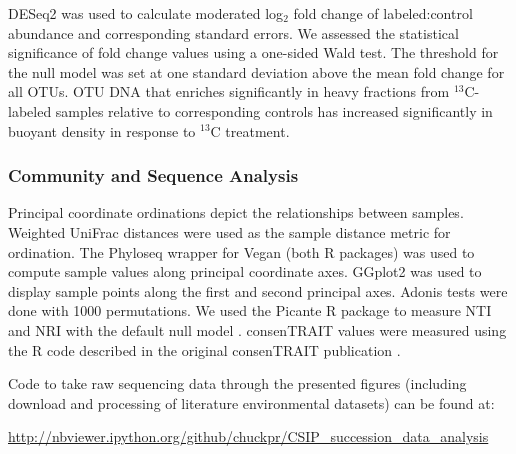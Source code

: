 \documentclass{article}
\begin{document}
DESeq2 was used to calculate moderated log$_{2}$ fold change of
labeled:control abundance and corresponding standard errors. We assessed
the statistical significance of fold change values using a one-sided Wald
test. The threshold for the null model was set at one standard deviation
above the mean fold change for all OTUs. OTU DNA that enriches
significantly in heavy fractions from $^{13}$C-labeled samples relative to
corresponding controls has increased significantly in buoyant density in
response to $^{13}$C treatment.

\subsubsection{Community and Sequence Analysis}\label{ord} Principal coordinate
ordinations depict the relationships between samples. Weighted UniFrac
\citep{Lozupone_2005} distances were used as the sample distance metric for
ordination. The Phyloseq \citep{McMurdie_2013} wrapper for Vegan
\citep{Dixon_2003} (both R packages) was used to compute sample values along
principal coordinate axes. GGplot2 \citep{Wickham_2009} was used to display
sample points along the first and second principal axes. Adonis tests
\citep{Anderson_2001} were done with 1000 permutations. We used the Picante
R package to measure NTI and NRI with the default null model
\citep{Kembel2010}. consenTRAIT values were measured using the R code
described in the original consenTRAIT publication \citep{Martiny2013}. 

Code to take raw sequencing data through the presented figures (including
download and processing of literature environmental datasets) can be
found at:

\url{http://nbviewer.ipython.org/github/chuckpr/CSIP_succession_data_analysis}
\end{document}

